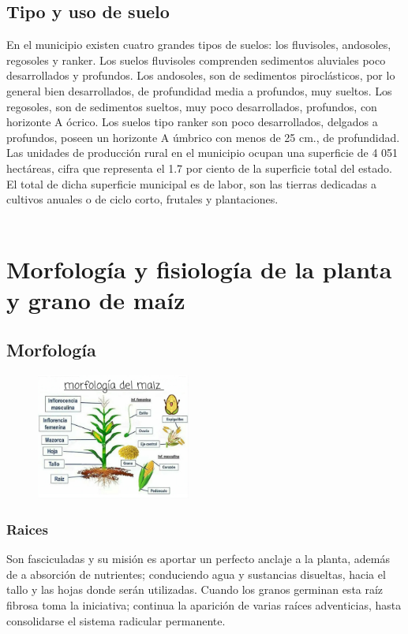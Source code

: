 \documentclass[utf8]{FrontiersinHarvard} %
\begin{document}
\subsection{Tipo y uso de suelo}
En el municipio existen cuatro grandes tipos de suelos: 
los fluvisoles, andosoles, regosoles y ranker. 
Los suelos fluvisoles comprenden sedimentos aluviales poco desarrollados y profundos. 
Los andosoles, son de sedimentos piroclásticos, por lo general bien desarrollados, 
de profundidad media a profundos, muy sueltos. Los regosoles, son de sedimentos sueltos, 
muy poco desarrollados, profundos, con horizonte A ócrico. 
Los suelos tipo ranker son poco desarrollados, delgados a profundos, 
poseen un horizonte A úmbrico con menos de 25 cm., de profundidad.
Las unidades de producción rural en el municipio ocupan una superficie de 4 051 hectáreas, 
cifra que representa el 1.7 por ciento de la superficie total del estado. 
El total de dicha superficie municipal es de labor, son las tierras dedicadas a cultivos anuales 
o de ciclo corto, frutales y plantaciones. 
\\\\


\section{Morfología y fisiología de la planta y grano de maíz}
\subsection{Morfología}
\begin{figure} %
    \centering
    \includegraphics[width=0.45\textwidth]{./images/morfologia.jpg}
\end{figure}

\subsubsection{Raices} 
    Son fasciculadas y su misión es aportar un perfecto anclaje a la planta, 
    además de a absorción de nutrientes; conduciendo agua y sustancias disueltas, 
    hacia el tallo y las hojas donde serán utilizadas. 
    Cuando los granos germinan esta raíz fibrosa toma la iniciativa;
     continua la aparición de varias raíces adventicias, 
     hasta consolidarse el sistema radicular permanente.
\end{document}
